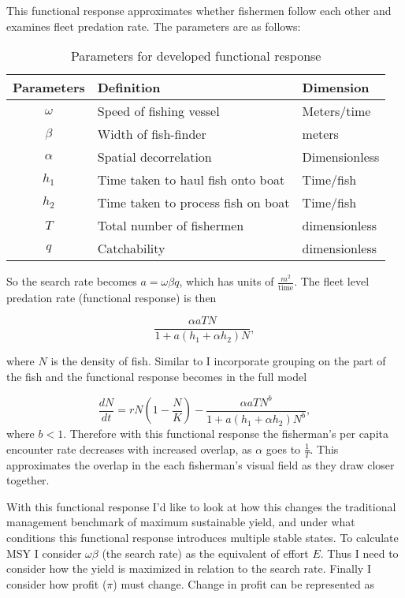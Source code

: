 \documentclass[12pt,a4paper]{report}
\begin{document}
This functional response approximates whether fishermen follow each other and examines fleet predation rate. The parameters are as follows: 

\begin{table}[htdp]
\caption{\small Parameters for developed functional response}
\begin{center}
\begin{tabular}{cll}
\hline
\hline
\bf Parameters & \bf Definition & \bf Dimension\\
\hline
\hline
$\omega$ & Speed of fishing vessel & Meters/time \\
$\beta$ & Width of fish-finder & meters \\
$\alpha$ & Spatial decorrelation & Dimensionless \\
$h_1$ & Time taken to haul fish onto boat & Time/fish \\
$h_2$ & Time taken to process fish on boat & Time/fish \\
$T$ & Total number of fishermen & dimensionless \\
$q$ & Catchability & dimensionless \\
\hline
\end{tabular}
\end{center}
\label{default}
\end{table}%

\noindent So the search rate becomes $a = \omega\beta q$, which has units of $\frac{m^2}{\text{time}}$. The fleet level predation rate (functional response) is then 

\begin{equation}
\frac{\alpha a T N}{1+a(h_1+\alpha h_2)N},
\end{equation}

\noindent where $N$ is the density of fish. Similar to \cite{Fryxelletal:2007} I incorporate grouping on the part of the fish and the functional response becomes in the full model 

\begin{equation}
\frac{dN}{dt} = rN\left(1-\frac{N}{K}\right)-\frac{\alpha a T N^b}{1+a(h_1+\alpha h_2)N^b},
\end{equation}
\noindent where $b<1$. Therefore with this functional response the fisherman's per capita encounter rate decreases with increased overlap, as $\alpha$ goes to $\frac{1}{T}$.  This approximates the overlap in the each fisherman's visual field as they draw closer together. 

With this functional response I'd like to look at how this changes the traditional management benchmark of maximum sustainable yield, and under what conditions this functional response introduces multiple stable states. To calculate MSY I consider $\omega\beta$ (the search rate) as the equivalent of effort $E$. Thus I need to consider how the yield is maximized in relation to the search rate. Finally I consider how profit ($\pi$) must change. Change in profit can be represented as 
\end{document}
